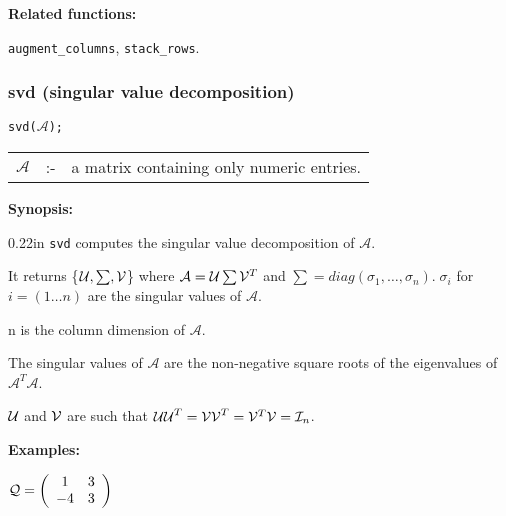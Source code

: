 {\bf Related functions:}

\hspace*{0.175in} {\tt augment\_columns}, {\tt stack\_rows}.


\subsubsection{svd (singular value decomposition)}
\label{linalg:svd}

\hspace*{0.175in} {\tt svd($\mathcal{A}$);}

\hspace*{0.1in}  
\begin{tabular}{l l l} 
$\mathcal{A}$ &:-& a matrix containing only numeric entries.
\end{tabular}

{\bf Synopsis:} %

\begin{addtolength}{\leftskip}{0.22in}
{\tt svd} computes the singular value decomposition of $\mathcal{A}$. 

It returns \{${\cal U},\sum,{\cal V}$\} where $\mathcal{A} = {\cal U} 
\sum {\cal V}^T$ and $\sum = diag(\sigma_{1}, \ldots ,\sigma_{n}). \; 
\sigma_{i}$ for $i= (1 \ldots n)$ are the singular values of $\mathcal{A}$.
 

n is the column dimension of $\mathcal{A}$.

The singular values of $\mathcal{A}$ are the non-negative square roots of 
the eigenvalues of $\mathcal{A}^T \mathcal{A}$. 

${\cal U}$ and ${\cal V}$ are such that ${\cal UU}^T = {\cal VV}^T = 
{\cal V}^T {\cal V} = {\cal I}_n$.

\end{addtolength}

{\bf Examples:}

\begin{flushleft}
\hspace*{0.175in}
\begin{math}  
{\cal Q} = \left( \begin{array}{cc} 1 & 3 \\ -4 & 3 
\end{array} \right)
\end{math}  
\end{flushleft}


